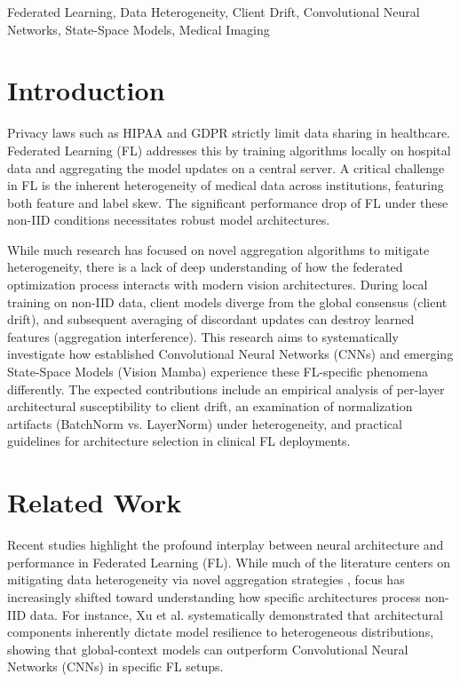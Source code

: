 \documentclass[conference]{IEEEtran}
\begin{document}
\begin{IEEEkeywords}
Federated Learning, Data Heterogeneity, Client Drift, Convolutional Neural Networks, State-Space Models, Medical Imaging
\end{IEEEkeywords}

\section{Introduction}
Privacy laws such as HIPAA and GDPR strictly limit data sharing in healthcare. Federated Learning (FL) addresses this by training algorithms locally on hospital data and aggregating the model updates on a central server. A critical challenge in FL is the inherent heterogeneity of medical data across institutions, featuring both feature and label skew. The significant performance drop of FL under these non-IID conditions necessitates robust model architectures. 

While much research has focused on novel aggregation algorithms to mitigate heterogeneity, there is a lack of deep understanding of how the federated optimization process interacts with modern vision architectures. During local training on non-IID data, client models diverge from the global consensus (client drift), and subsequent averaging of discordant updates can destroy learned features (aggregation interference). This research aims to systematically investigate how established Convolutional Neural Networks (CNNs) and emerging State-Space Models (Vision Mamba) experience these FL-specific phenomena differently. The expected contributions include an empirical analysis of per-layer architectural susceptibility to client drift, an examination of normalization artifacts (BatchNorm vs. LayerNorm) under heterogeneity, and practical guidelines for architecture selection in clinical FL deployments.

\section{Related Work}
Recent studies highlight the profound interplay between neural architecture and performance in Federated Learning (FL). While much of the literature centers on mitigating data heterogeneity via novel aggregation strategies \cite{b1}, focus has increasingly shifted toward understanding how specific architectures process non-IID data. For instance, Xu et al. \cite{b2} systematically demonstrated that architectural components inherently dictate model resilience to heterogeneous distributions, showing that global-context models can outperform Convolutional Neural Networks (CNNs) in specific FL setups. 
\end{document}

